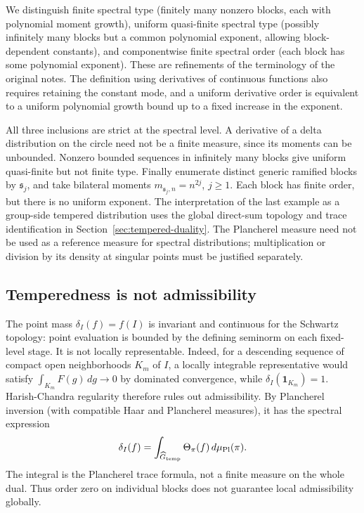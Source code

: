 We distinguish finite spectral type (finitely many nonzero blocks, each with polynomial moment growth), uniform quasi-finite spectral type (possibly infinitely many blocks but a common polynomial exponent, allowing block-dependent constants), and componentwise finite spectral order (each block has some polynomial exponent). These are refinements of the terminology of the original notes. The definition using derivatives of continuous functions also requires retaining the constant mode, and a uniform derivative order is equivalent to a uniform polynomial growth bound up to a fixed increase in the exponent.

\begin{center}
\end{center}
All three inclusions are strict at the spectral level. A derivative of a delta distribution on the circle need not be a finite measure, since its moments can be unbounded. Nonzero bounded sequences in infinitely many blocks give uniform quasi-finite but not finite type. Finally enumerate distinct generic ramified blocks by $\mathfrak s_j$, and take bilateral moments $m_{\mathfrak s_j,n}=n^{2j}$, $j\ge1$. Each block has finite order, but there is no uniform exponent. The interpretation of the last example as a group-side tempered distribution uses the global direct-sum topology and trace identification in Section~\ref{sec:tempered-duality}. The Plancherel measure need not be used as a reference measure for spectral distributions; multiplication or division by its density at singular points must be justified separately.

\subsection{Temperedness is not admissibility}
The point mass $\delta_I(f)=f(I)$ is invariant and continuous for the Schwartz topology: point evaluation is bounded by the defining seminorm on each fixed-level stage. It is not locally representable. Indeed, for a descending sequence of compact open neighborhoods $K_m$ of $I$, a locally integrable representative would satisfy $\int_{K_m}F(g)\,dg\to0$ by dominated convergence, while $\delta_I(\mathbf1_{K_m})=1$. Harish-Chandra regularity therefore rules out admissibility. By Plancherel inversion (with compatible Haar and Plancherel measures), it has the spectral expression
\[
\delta_I(f)=\int_{\widehat G_{\rm temp}}\Theta_\pi(f)\,d\mu_{\rm Pl}(\pi).
\]
The integral is the Plancherel trace formula, not a finite measure on the whole dual. Thus order zero on individual blocks does not guarantee local admissibility globally.

